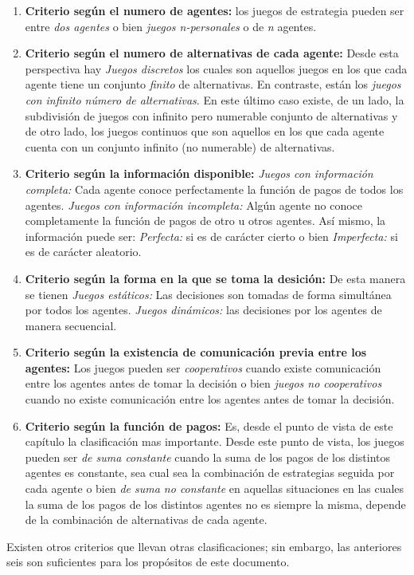 \begin{enumerate}
\item \textbf{Criterio según el numero de agentes:} los juegos de estrategia pueden ser entre \textit{dos agentes} o bien \textit{juegos n-personales} o de \textit{n} agentes.
\item \textbf{Criterio según el numero de alternativas de cada agente:} Desde esta perspectiva hay \textit{Juegos discretos} los cuales son aquellos juegos en los que cada agente tiene un conjunto \textit{finito} de alternativas. En contraste, están los \textit{juegos con infinito número de alternativas}. En este último caso existe, de un lado, la subdivisión de juegos con infinito pero numerable conjunto de alternativas y de otro lado, los juegos continuos que son aquellos en los que cada agente cuenta con un conjunto infinito (no numerable) de alternativas.
\item \textbf{Criterio según la información disponible:} \textit{Juegos con información completa:} Cada agente conoce perfectamente la función de pagos de todos los agentes. \textit{Juegos con información incompleta:} Algún agente no conoce completamente la función de pagos de otro u otros agentes. Así mismo, la información puede ser: \textit{Perfecta:} si es de carácter cierto o bien \textit{Imperfecta:} si es de carácter aleatorio.
\item \textbf{Criterio según la forma en la que se toma la desición:} De esta manera se tienen \textit{Juegos estáticos:} Las decisiones son tomadas de forma simultánea por todos los agentes. \textit{Juegos dinámicos:} las decisiones por los agentes de manera secuencial.
\item \textbf{Criterio según la existencia de comunicación previa entre los agentes:} Los juegos pueden ser \textit{cooperativos} cuando existe comunicación entre los agentes antes de tomar la decisión o bien \textit{juegos no cooperativos} cuando no existe comunicación entre los agentes antes de tomar la decisión.
\item \textbf{Criterio según la función de pagos:} Es, desde el punto de vista de este capítulo la clasificación mas importante. Desde este punto de vista, los juegos pueden ser \textit{de suma constante} cuando la suma de los pagos de los distintos agentes es constante, sea cual sea la combinación de estrategias seguida por cada agente o bien \textit{de suma no constante} en aquellas situaciones en las cuales la suma de los pagos de los distintos agentes no es siempre la misma, depende de la combinación de alternativas de cada agente.
\end{enumerate}
Existen otros criterios que llevan otras clasificaciones; sin embargo, las anteriores seis son suficientes para los propósitos de este documento.

